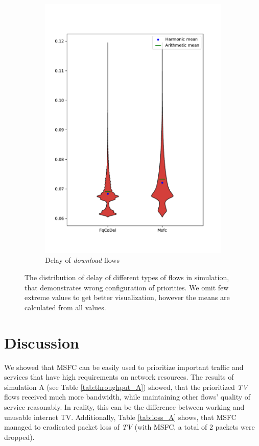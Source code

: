 \begin{figure}
\begin{subfigure}[b]{0.475\textwidth}
		\includegraphics[width=\textwidth]{drawings/type5-delay-down_B}
		\caption[]%
		{{\small Delay of \emph{download} flows}}    
		\label{fig:delay_download_B}
	\end{subfigure}
	\caption[]
	{\small The distribution of delay of different types of flows in simulation, that demonstrates wrong configuration of priorities. We omit few extreme values to get better visualization, however the means are calculated from all values.} 
	\label{fig:delay_flows_B}
\end{figure}



\section{Discussion}

We showed that MSFC can be easily used to prioritize important traffic and services that have high requirements on network resources. The results of simulation A (see Table \ref{tab:throughput_A}) showed, that the prioritized \emph{TV} flows received much more bandwidth, while maintaining other flows' quality of service reasonably. In reality, this can be the difference between working and unusable internet TV. Additionally, Table \ref{tab:loss_A} shows, that MSFC managed to eradicated packet loss of \emph{TV} (with MSFC, a total of 2 packets were dropped). 

